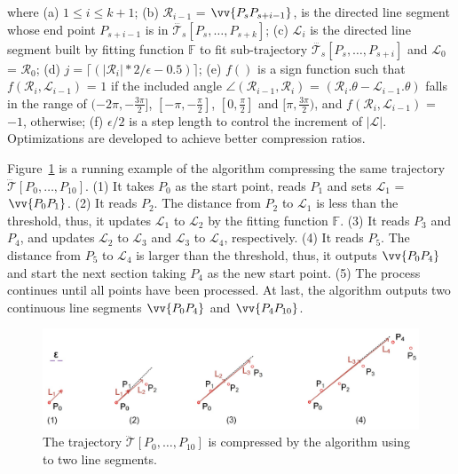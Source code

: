 \ni where (a) $1 \le i \le k+1$; (b) $\mathcal{R}_{i-1}$ = $\vv{P_sP_{s+i-1}}$, is the directed line segment whose end point $P_{s+i-1}$ is in $\dddot{\mathcal{T}_s}[P_s, \ldots, P_{s+k}]$; (c) $\mathcal{L}_{i}$ is the directed line segment built by fitting function $\mathbb{F}$ to fit sub-trajectory $\dddot{\mathcal{T}_s}[P_s, \ldots, P_{s+i}]$ and $\mathcal{L}_{0}$ = $\mathcal{R}_{0}$; (d) $j = \lceil(|\mathcal{R}_{i}|*2/\epsilon - 0.5)\rceil$; (e) $f()$ is a sign function such that $ f(\mathcal{R}_i,\mathcal{L}_{i-1})$ = $1$ if the included angle $\angle(\mathcal{R}_{i-1}, \mathcal{R}_{i})$ = $(\mathcal{R}_i.\theta - \mathcal{L}_{i-1}.\theta)$ falls in the range of $(-2\pi, -\frac{3\pi}{2}]$, $[-\pi, -\frac{\pi}{2}]$, $[0, \frac{\pi}{2}]$ and $[\pi, \frac{3\pi}{2})$, and $f(\mathcal{R}_i,\mathcal{L}_{i-1})$ = $-1$, otherwise; (f) $\epsilon/2$ is a step length to control the increment of $|\mathcal{L}|$.
%
Optimizations are developed to achieve better compression ratios.


\begin{example}
	\label{exm-alg-operb}
	Figure~\ref{fig:operb} is a running example of the \operb algorithm compressing the same trajectory $\dddot{\mathcal{T}}[P_0, \ldots, P_{10}]$.
	(1) It takes $P_0$ as the start point, reads $P_1$ and sets $\mathcal{L}_1$ = $\vv{P_0P_1}$.
	(2) It reads $P_2$. The distance from $P_2$ to $\mathcal{L}_1$ is less than the threshold, thus, it updates $\mathcal{L}_1$  to $\mathcal{L}_2$ by the fitting function $\mathbb{F}$.
	(3) It reads $P_3$ and $P_4$, and updates $\mathcal{L}_2$ to $\mathcal{L}_3$ and $\mathcal{L}_3$ to $\mathcal{L}_4$, respectively.
	(4) It reads $P_5$. The distance from $P_5$ to $\mathcal{L}_4$ is larger than the threshold, thus, it outputs $\vv{P_0P_4}$ and start the next section taking $P_4$ as the new start point.
	(5) The process continues until all points have been processed. At last, the algorithm outputs two continuous line segments $\vv{P_0P_4}$ and $\vv{P_4P_{10}}$.
\end{example}


\begin{figure}[tb!]
	\centering
	\includegraphics[scale=0.66]{Figures/Fig-OPER.jpg}
	\vspace{-1ex}
	\caption{\small The trajectory $\dddot{\mathcal{T}}[P_0, \ldots, P_{10}]$ is compressed by the \operb algorithm using \ped to two line segments.}
	\vspace{-1ex}
	\label{fig:operb}
\end{figure}


